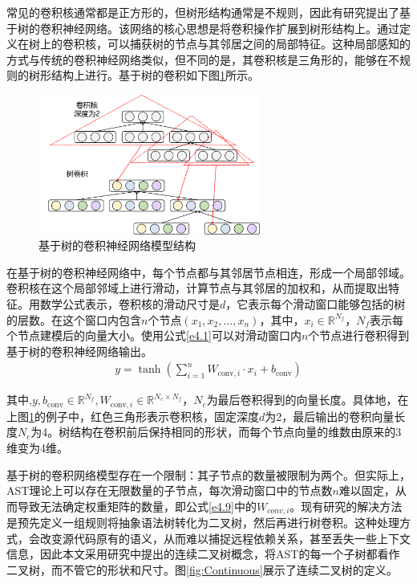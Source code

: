 常见的卷积核通常都是正方形的，但树形结构通常是不规则，因此有研究\cite{8813290}提出了基于树的卷积神经网络。该网络的核心思想是将卷积操作扩展到树形结构上。通过定义在树上的卷积核，可以捕获树的节点与其邻居之间的局部特征。这种局部感知的方式与传统的卷积神经网络类似，但不同的是，其卷积核是三角形的，能够在不规则的树形结构上进行。基于树的卷积如下图\ref{fig:TreeBaseConvolution}所示。

\begin{figure}[H]
  \centering
  \includegraphics[width=0.65\textwidth]{figures/TreeBaseConvolution.png}
  \caption{基于树的卷积神经网络模型结构}\label{fig:TreeBaseConvolution}
\end{figure}

在基于树的卷积神经网络中，每个节点都与其邻居节点相连，形成一个局部邻域。卷积核在这个局部邻域上进行滑动，计算节点与其邻居的加权和，从而提取出特征。用数学公式表示，卷积核的滑动尺寸是$d$，它表示每个滑动窗口能够包括的树的层数。在这个窗口内包含$n$个节点$\left(x_1,x_2,\ldots,x_n\right)$，其中，$x_i \in \mathbb{R}^{N_{f}}$，$N_{f}$表示每个节点建模后的向量大小。使用公式\ref{e4.1}可以对滑动窗口内$n$个节点进行卷积得到基于树的卷积神经网络输出。
\begin{equation}\label{e4.1}
  \begin{split}
    y = \tanh \left(\sum_{i=1}^{n} W_{\text{conv}, i} \cdot x_{i}+b_{\text{conv}}\right)
  \end{split}
\end{equation}

其中,$y, b_{\text{conv}} \in \mathbb{R}^{N_{f}}, W_{\text{conv}, i} \in \mathbb{R}^{N_{c} \times N_{f}}$，$N_{c}$为最后卷积得到的向量长度。具体地，在上图\ref{fig:TreeBaseConvolution}的例子中，红色三角形表示卷积核，固定深度$d$为2，最后输出的卷积向量长度$N_{c}$为4。树结构在卷积前后保持相同的形状，而每个节点向量的维数由原来的3维变为4维。

基于树的卷积网络模型存在一个限制：其子节点的数量被限制为两个。但实际上，AST理论上可以存在无限数量的子节点，每次滑动窗口中的节点数$n$难以固定，从而导致无法确定权重矩阵的数量，即公式\ref{e4.9}中的$W_{conv,i}$。现有研究的解决方法是预先定义一组规则将抽象语法树转化为二叉树，然后再进行树卷积。这种处理方式，会改变源代码原有的语义，从而难以捕捉远程依赖关系，甚至丢失一些上下文信息，因此本文采用研究\cite{8813290}中提出的连续二叉树概念，将AST的每一个子树都看作二叉树，而不管它的形状和尺寸。图\ref{fig:Continuous}展示了连续二叉树的定义。

